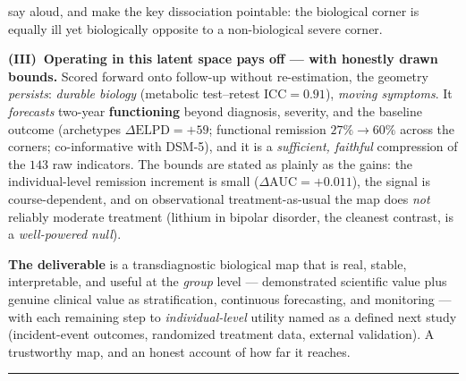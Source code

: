 \documentclass[11pt]{article}
\begin{document}
\begin{titlepage}
{say aloud, and make the key dissociation pointable: the biological corner is equally ill yet biologically
opposite to a non-biological severe corner.\par\vspace{4pt}
\textbf{(III)~Operating in this latent space pays off --- with honestly drawn bounds.} Scored forward onto
follow-up without re-estimation, the geometry \emph{persists}: \emph{durable biology} (metabolic test--retest
$\text{ICC}=0.91$), \emph{moving symptoms}. It \emph{forecasts} two-year \textbf{functioning} beyond diagnosis,
severity, and the baseline outcome (archetypes $\Delta\text{ELPD}=+59$; functional remission $27\%\!\to\!60\%$
across the corners; co-informative with DSM-5), and it is a \emph{sufficient, faithful} compression of the
$143$ raw indicators. The bounds are stated as plainly as the gains: the individual-level remission increment is
small ($\Delta\text{AUC}=+0.011$), the signal is course-dependent, and on observational treatment-as-usual the
map does \emph{not} reliably moderate treatment (lithium in bipolar disorder, the cleanest contrast, is a
\emph{well-powered null}).\par\vspace{4pt}
\textbf{The deliverable} is a transdiagnostic biological map that is real, stable, interpretable, and useful at
the \emph{group} level --- demonstrated scientific value plus genuine clinical value as stratification,
continuous forecasting, and monitoring --- with each remaining step to \emph{individual-level} utility named as
a defined next study (incident-event outcomes, randomized treatment data, external validation). A trustworthy
map, and an honest account of how far it reaches.}\par\vspace{7pt}
{\color{facerule}\rule{\linewidth}{0.6pt}}

\vfill
\end{titlepage}

\thispagestyle{plain}
{\small\tableofcontents}
\clearpage


\end{document}
